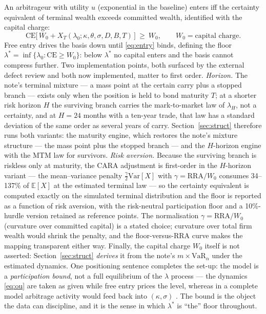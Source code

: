 \documentclass[11pt]{article}
\newcommand{\CE}{\mathrm{CE}}
\newcommand{\VaR}{\mathrm{VaR}}
\begin{document}
An arbitrageur with utility $u$ (exponential in the baseline) enters iff the certainty equivalent of terminal wealth exceeds committed wealth, identified with the capital charge:
\begin{equation}
\CE\big[\,W_0+X_T(\lambda_0;\kappa,\theta,\sigma,D,B,T)\,\big]\ \ge\ W_0,\qquad W_0=\text{capital charge}.
\label{eq:entry}
\end{equation}
Free entry drives the basis down until \eqref{eq:entry} binds, defining the floor $\lambda^*=\inf\{\lambda_0:\CE\ge W_0\}$: below $\lambda^*$ no capital enters and the basis cannot compress further. Two implementation points, both surfaced by the external defect review and both now implemented, matter to first order. \emph{Horizon.} The note's terminal mixture --- a mass point at the certain carry plus a stopped branch --- exists only when the position is held to bond maturity $T$; at a shorter risk horizon $H$ the surviving branch carries the mark-to-market law of $\lambda_H$, not a certainty, and at $H=24$ months with a ten-year trade, that law has a standard deviation of the same order as several years of carry. Section~\ref{sec:struct} therefore runs both variants: the maturity engine, which restores the note's mixture structure --- the mass point plus the stopped branch --- and the $H$-horizon engine with the MTM law for survivors. \emph{Risk aversion.} Because the surviving branch is riskless only at maturity, the CARA adjustment is first-order in the $H$-horizon variant --- the mean--variance penalty $\tfrac{\gamma}{2}\mathrm{Var}[X]$ with $\gamma=\text{RRA}/W_0$ consumes 34--137\% of $\mathbb{E}[X]$ at the estimated terminal law --- so the certainty equivalent is computed exactly on the simulated terminal distribution and the floor is reported as a function of risk aversion, with the risk-neutral participation floor and a 10\%-hurdle version retained as reference points. The normalisation $\gamma=\text{RRA}/W_0$ (curvature over committed capital) is a stated choice; curvature over total firm wealth would shrink the penalty, and the floor-versus-RRA curve makes the mapping transparent either way. Finally, the capital charge $W_0$ itself is not asserted: Section~\ref{sec:struct} \emph{derives} it from the note's $m\times\VaR_\alpha$ under the estimated dynamics. One positioning sentence completes the set-up: the model is a \emph{participation bound}, not a full equilibrium of the $\lambda$ process --- the dynamics \eqref{eq:ou} are taken as given while free entry prices the level, whereas in a complete model arbitrage activity would feed back into $(\kappa,\sigma)$ \citep{kondor2009}. The bound is the object the data can discipline, and it is the sense in which $\lambda^*$ is ``the'' floor throughout.
\end{document}
